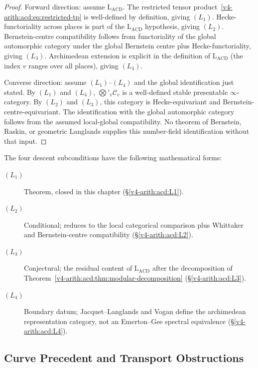 \begin{proof}
Forward direction: assume \(\mathrm{L}_{\mathrm{ACD}}\). The restricted
tensor product~\eqref{v4-arith:acd:eq:restricted-tp} is well-defined
by definition, giving \((L_{1})\). Hecke-functoriality across places
is part of the \(\mathrm{L}_{\mathrm{ACD}}\) hypothesis, giving
\((L_{2})\). Bernstein-centre compatibility follows from functoriality
of the global automorphic category under the global Bernstein centre
plus Hecke-functoriality, giving \((L_{3})\). Archimedean extension is
explicit in the definition of \(\mathrm{L}_{\mathrm{ACD}}\) (the index
\(v\) ranges over all places), giving \((L_{4})\).

Converse direction: assume \((L_{1})\)--\((L_{4})\) and the global
identification just stated. By \((L_{1})\) and
\((L_{4})\), \(\bigotimes'_{v}\mathcal{C}_{v}\) is a well-defined stable
presentable \(\infty\)-category. By \((L_{2})\) and \((L_{3})\), this
category is Hecke-equivariant and Bernstein-centre-equivariant. The
identification with the global automorphic category follows from
the assumed local-global compatibility. No theorem of Bernstein,
Raskin, or geometric Langlands supplies this number-field
identification without that input.
\end{proof}

\begin{remark}
\label{v4-arith:acd:rem:subcondition-form}
The four descent subconditions have the following mathematical forms:
\begin{description}
\item[\((L_{1})\)] Theorem, closed in this chapter
(\S\ref{v4-arith:acd:L1}).
\item[\((L_{2})\)] Conditional; reduces to the local categorical
comparison plus Whittaker and Bernstein-centre compatibility
(\S\ref{v4-arith:acd:L2}).
\item[\((L_{3})\)] Conjectural; the residual content of
\(\mathrm{L}_{\mathrm{ACD}}\) after the decomposition of
Theorem~\ref{v4-arith:acd:thm:modular-decomposition}
(\S\ref{v4-arith:acd:L3}).
\item[\((L_{4})\)] Boundary datum; Jacquet--Langlands and Vogan define
the archimedean representation category, not an Emerton--Gee spectral
equivalence (\S\ref{v4-arith:acd:L4}).
\end{description}
\end{remark}

\subsection{Curve Precedent and Transport Obstructions}
\label{v4-arith:acd:obstruction-2}

